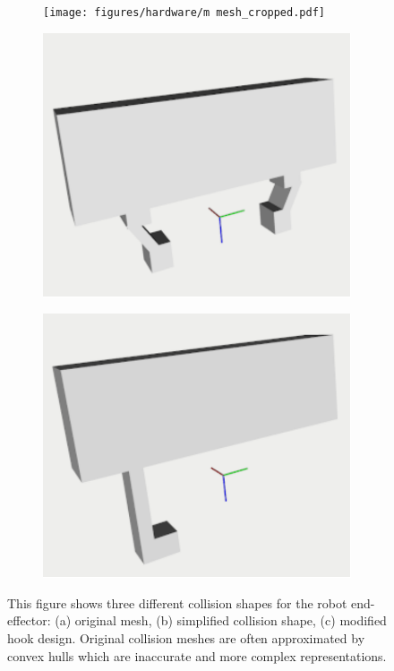 \begin{figure}[t]
\centering
\hfill
\begin{subfigure}{0.3\columnwidth}
    \texttt{[image: figures/hardware/m mesh\_cropped.pdf]}
    \caption{}
\end{subfigure}%
\hfill
\begin{subfigure}{0.3\columnwidth}
    \includegraphics[width=\linewidth]{figures/doulbe_simple_cropped.pdf}
    \caption{}
\end{subfigure}%
\hfill
\begin{subfigure}{0.3\columnwidth}
    \includegraphics[width=\linewidth]{figures/single_hook_cropped.pdf}
    \caption{}
\end{subfigure}
\hfill
\caption{This figure shows three different collision shapes for the robot end-effector: (a) original mesh, (b) simplified collision shape, (c) modified hook design. Original collision meshes are often approximated by convex hulls which are inaccurate and more complex representations.}\label{fig:1}
\end{figure}


